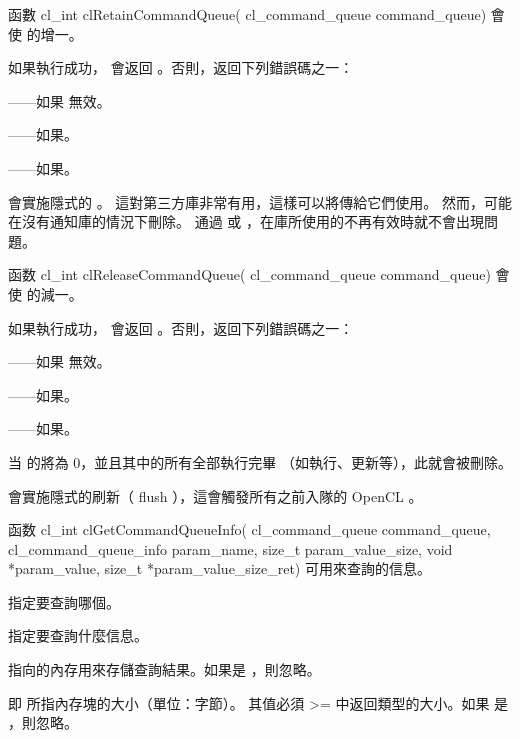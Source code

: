 函數
\startclc
cl_int clRetainCommandQueue(
		cl_command_queue command_queue)
\stopclc
會使  的增一。

如果執行成功， 會返回 。否則，返回下列錯誤碼之一：
\startigBase
\item {}——如果  無效。
\item {}——如果\scdevfailres。
\item {}——如果\schostfailres。
\stopigBase

 會實施隱式的 。
這對第三方庫非常有用，這樣可以將傳給它們使用。
然而，可能在沒有通知庫的情況下刪除。
通過  或  ，在庫所使用的不再有效時就不會出現問題。

函数
\startclc
cl_int clReleaseCommandQueue(
		cl_command_queue command_queue)
\stopclc
會使  的減一。

如果執行成功， 會返回 。否則，返回下列錯誤碼之一：
\startigBase
\item {}——如果  無效。
\item {}——如果\scdevfailres。
\item {}——如果\schostfailres。
\stopigBase

当  的將為 0，並且其中的所有全部執行完畢
（如執行、更新等），此就會被刪除。

會實施隱式的刷新（ flush ），這會觸發所有之前入隊的 OpenCL 。

函数
\startclc
cl_int clGetCommandQueueInfo(
		cl_command_queue command_queue,
		cl_command_queue_info param_name,
		size_t param_value_size,
		void *param_value,
		size_t *param_value_size_ret)
\stopclc
可用來查詢的信息。

 指定要查詢哪個。

 指定要查詢什麼信息。

 指向的內存用來存儲查詢結果。如果是 ，則忽略。

 即  所指內存塊的大小（單位：字節）。
其值必須 >= 中返回類型的大小。如果  是 ，則忽略。

